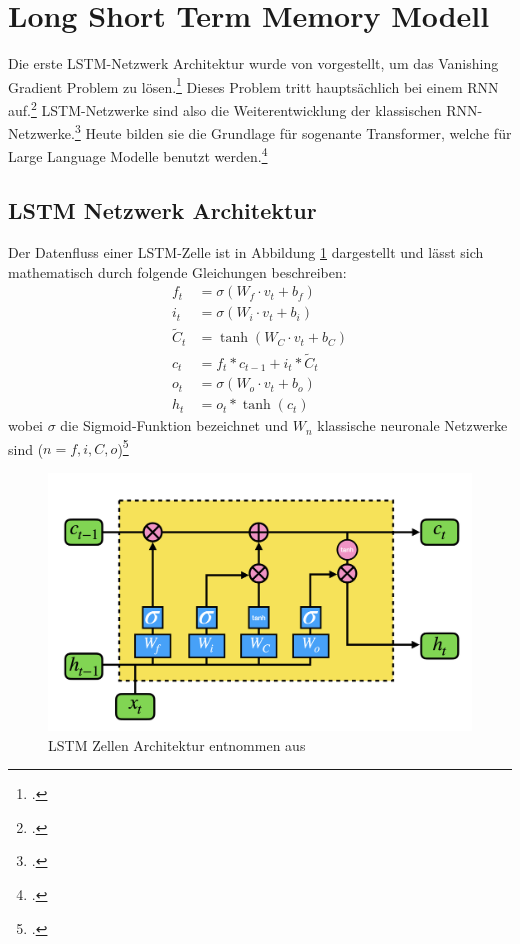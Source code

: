 \section{Long Short Term Memory Modell}
Die erste \ac{LSTM}-Netzwerk Architektur wurde von \cite{Hochreiter1997} vorgestellt, um das Vanishing Gradient Problem zu lösen.\footcite[Vgl.][S. 5931]{VanHoudt2020} Dieses Problem tritt hauptsächlich bei einem \ac{RNN} auf.\footcite[Vgl.][]{Informatik2003}
\ac{LSTM}-Netzwerke sind also die Weiterentwicklung der klassischen \ac{RNN}-Netzwerke.\footcite[Vgl.][]{Hochreiter1997}
Heute bilden sie die Grundlage für sogenante Transformer, welche für Large Language Modelle benutzt werden.\footcite[Vgl.][]{Vaswani2017}


\subsection{LSTM Netzwerk Architektur}

Der Datenfluss einer LSTM-Zelle ist in Abbildung \ref{abb:lstm} dargestellt und lässt sich mathematisch durch folgende Gleichungen beschreiben:
\begin{align}
    f_t &= \sigma(W_f \cdot v_t + b_f) \label{eq:1a} \\
    i_t &= \sigma(W_i \cdot v_t + b_i) \label{eq:1b} \\
    \widetilde{C}_t &= \tanh(W_C \cdot v_t + b_C) \label{eq:1c} \\
    c_t &= f_t \ast c_{t-1} + i_t \ast \widetilde{C}_t \label{eq:1d} \\
    o_t &= \sigma(W_o \cdot v_t + b_o) \label{eq:1e} \\
    h_t &= o_t \ast \tanh(c_t) \label{eq:1f}
\end{align}
wobei $\sigma$ die Sigmoid-Funktion bezeichnet und $W_n$ klassische neuronale Netzwerke sind ($n = f, i, C, o$)\footcite[Vgl.][S. 5]{Chen2022}

\begin{figure}[htb]
    \centering
    \includegraphics[width=13cm]{lib/graphics/LSTM.png}
    \caption[Long Short Term Memory Architektur]{\ac{LSTM} Zellen Architektur entnommen aus~\cite[S. 6]{Chen2022}}
    \label{abb:lstm}
\end{figure}

